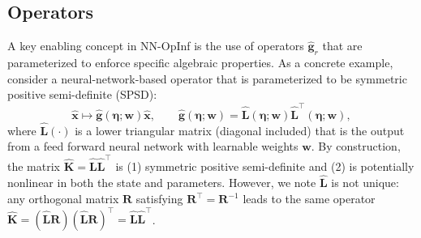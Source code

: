 \documentclass[3p,computermodern,11pt]{elsarticle}
\numberwithin{equation}{section}
\newcommand{\reducedState}{\hat{\state}}
\newcommand{\reducedVelocityNN}{\hat{\boldsymbol g}}
\newcommand{\networkInputs}{\boldsymbol \eta}
\newcommand{\reducedSpdMatrixNN}{\hat{\boldsymbol K}}
\newcommand{\reducedSpdMatrixLowerNN}{\hat{\boldsymbol L}}
\newcommand{\weights}{\mathbf{w}}
\newcommand{\state}{\boldsymbol x}
\begin{document}
\subsection{Operators}
A key enabling concept in NN-OpInf is the use of operators $\reducedVelocityNN_r$ that are parameterized to enforce specific algebraic properties. As a concrete example, consider a neural-network-based operator that is parameterized to be symmetric positive semi-definite (SPSD):
 \begin{equation}\label{eq:spd_nn}
\reducedState \mapsto \reducedVelocityNN( \networkInputs ; \weights )\reducedState, \qquad  \reducedVelocityNN( \networkInputs ; \weights ) = \reducedSpdMatrixLowerNN(\networkInputs;\weights) \reducedSpdMatrixLowerNN^\intercal(\networkInputs; \weights), 
\end{equation}
where $\reducedSpdMatrixLowerNN(\cdot)$ is a lower triangular matrix (diagonal included) that is the output from a feed forward neural network with learnable weights $\weights$.  By construction, the matrix $\reducedSpdMatrixNN =   \reducedSpdMatrixLowerNN \reducedSpdMatrixLowerNN^\intercal$ is (1) symmetric positive semi-definite and (2) is potentially nonlinear in both the state and parameters.  However, we note $\reducedSpdMatrixLowerNN$ is not unique: any orthogonal matrix $\boldsymbol{R}$ satisfying $\boldsymbol{R}^\intercal = \boldsymbol{R}^{-1}$ leads to the same operator $\reducedSpdMatrixNN = (\reducedSpdMatrixLowerNN\boldsymbol{R}) (\reducedSpdMatrixLowerNN\boldsymbol{R})^\intercal =\reducedSpdMatrixLowerNN \reducedSpdMatrixLowerNN^\intercal$.
\end{document}
